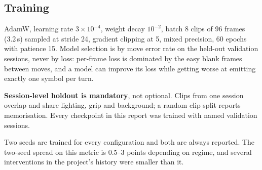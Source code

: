 \subsection{Training}

AdamW, learning rate $3\times10^{-4}$, weight decay $10^{-2}$, batch 8 clips
of 96 frames (3.2\,s) sampled at stride 24, gradient clipping at 5, mixed
precision, 60 epochs with patience 15. Model selection is by move error rate
on the held-out validation sessions, never by loss: per-frame loss is
dominated by the easy blank frames between moves, and a model can improve
its loss while getting worse at emitting exactly one symbol per turn.

\textbf{Session-level holdout is mandatory}, not optional. Clips from one
session overlap and share lighting, grip and background; a random clip split
reports memorisation. Every checkpoint in this report was trained with named
validation sessions.

Two seeds are trained for every configuration and both are always reported.
The two-seed spread on this metric is 0.5--3 points depending on regime, and
several interventions in the project's history were smaller than it.

